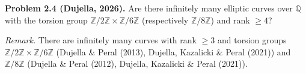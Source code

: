\textbf{Problem 2.4 (Dujella, 2026).} Are there infinitely many elliptic curves over $\mathbb{Q}$ with the torsion group $\mathbb{Z}/2\mathbb{Z}\times\mathbb{Z}/6\mathbb{Z}$ (respectively $\mathbb{Z}/8\mathbb{Z}$) and rank $\geqslant 4$?

\medskip

\textit{Remark.} There are infinitely many curves with rank $\geqslant 3$ and torsion groups $\mathbb{Z}/2\mathbb{Z}\times\mathbb{Z}/6\mathbb{Z}$ (Dujella \& Peral (2013), Dujella, Kazalicki \& Peral (2021)) and $\mathbb{Z}/8\mathbb{Z}$ (Dujella \& Peral (2012), Dujella, Kazalicki \& Peral (2021)).
